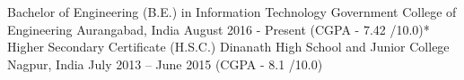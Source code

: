 

\begin{cventries}

\cventry
    {Bachelor of Engineering (B.E.) in Information Technology} %
    {Government College of Engineering} %
    {Aurangabad, India} %
    {August 2016 - Present} %
    {(CGPA - 7.42 /10.0)*} 
\vspace{1em}
\cventry
    {Higher Secondary Certificate (H.S.C.)} %
    {Dinanath High School and Junior College} %
    {Nagpur, India} %
    {July 2013 – June 2015}%
    {(CGPA - 8.1 /10.0)}   
\end{cventries}
